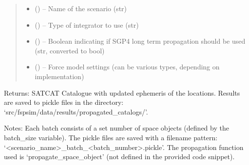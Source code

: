 \documentclass[letterpaper,10pt,english]{sphinxmanual}
\begin{document}
\begin{fulllineitems}
\begin{quote}
\begin{description}
\begin{itemize}
\item {} 
\sphinxAtStartPar
{} (\sphinxstyleliteralemphasis{\sphinxupquote{\sphinxhyphen{}}}) – Name of the scenario (str)

\item {} 
\sphinxAtStartPar
{} (\sphinxstyleliteralemphasis{\sphinxupquote{\sphinxhyphen{}}}) – Type of integrator to use (str)

\item {} 
\sphinxAtStartPar
{} (\sphinxstyleliteralemphasis{\sphinxupquote{\sphinxhyphen{}}}) – Boolean indicating if SGP4 long term propagation should be used (str, converted to bool)

\item {} 
\sphinxAtStartPar
{} (\sphinxstyleliteralemphasis{\sphinxupquote{\sphinxhyphen{}}}) – Force model settings (can be various types, depending on implementation)

\end{itemize}

\end{description}\end{quote}

\sphinxAtStartPar
Returns:
SATCAT Catalogue with updated ephemeris of the locations.
Results are saved to pickle files in the directory: ‘src/fspsim/data/results/propagated\_catalogs/’.

\sphinxAtStartPar
Notes:
\sphinxhyphen{} Each batch consists of a set number of space objects (defined by the batch\_size variable).
\sphinxhyphen{} The pickle files are saved with a filename pattern: ‘<scenario\_name>\_batch\_<batch\_number>.pickle’.
\sphinxhyphen{} The propagation function used is ‘propagate\_space\_object’ (not defined in the provided code snippet).

\end{fulllineitems}

\end{document}
